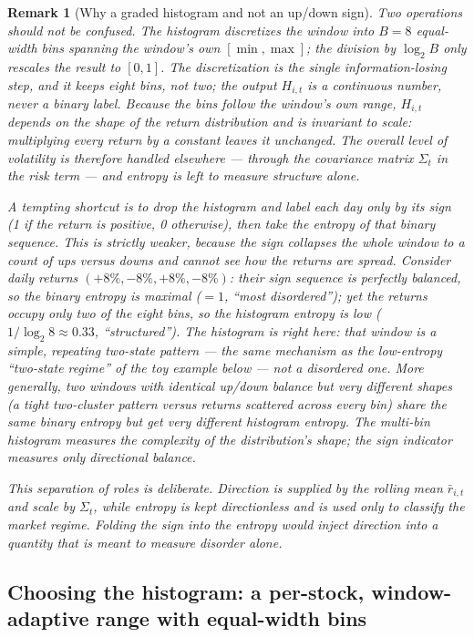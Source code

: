 \documentclass[a4paper,12pt]{article}
\newtheorem{remark}{Remark}[section]
\begin{document}
\begin{remark}[Why a graded histogram and not an up/down sign]
\label{rem:histogram}
Two operations should not be confused. The histogram \emph{discretizes} the window into $B=8$ equal-width bins spanning the window's own $[\min,\max]$; the division by $\log_2 B$ only \emph{rescales} the result to $[0,1]$. The discretization is the single information-losing step, and it keeps eight bins, not two; the output $H_{i,t}$ is a continuous number, never a binary label. Because the bins follow the window's own range, $H_{i,t}$ depends on the \emph{shape} of the return distribution and is invariant to scale: multiplying every return by a constant leaves it unchanged. The overall level of volatility is therefore handled elsewhere --- through the covariance matrix $\Sigma_t$ in the risk term --- and entropy is left to measure structure alone.

A tempting shortcut is to drop the histogram and label each day only by its sign (1 if the return is positive, 0 otherwise), then take the entropy of that binary sequence. This is strictly weaker, because the sign collapses the whole window to a count of ups versus downs and cannot see how the returns are spread. Consider daily returns $(+8\%,-8\%,+8\%,-8\%)$: their sign sequence is perfectly balanced, so the binary entropy is maximal (${=}1$, ``most disordered''); yet the returns occupy only two of the eight bins, so the histogram entropy is low ($1/\log_2 8\approx 0.33$, ``structured''). The histogram is right here: that window is a simple, repeating two-state pattern --- the same mechanism as the low-entropy ``two-state regime'' of the toy example below --- not a disordered one. More generally, two windows with identical up/down balance but very different shapes (a tight two-cluster pattern versus returns scattered across every bin) share the same binary entropy but get very different histogram entropy. The multi-bin histogram measures the \emph{complexity of the distribution's shape}; the sign indicator measures only directional balance.

This separation of roles is deliberate. Direction is supplied by the rolling mean $\bar r_{i,t}$ and scale by $\Sigma_t$, while entropy is kept directionless and is used \emph{only} to classify the market regime. Folding the sign into the entropy would inject direction into a quantity that is meant to measure disorder alone.
\end{remark}

\subsection{Choosing the histogram: a per-stock, window-adaptive range with equal-width bins}
\label{sec:binning}
\end{document}

